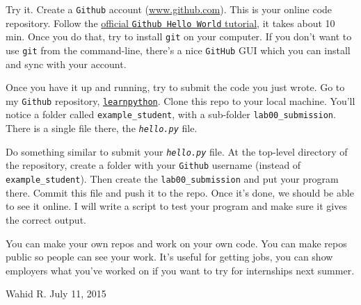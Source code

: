 \documentclass[letterpaper,14pt,oneside]{extarticle}
\begin{document}
Try it. Create a \texttt{Github} account (\url{www.github.com}). This is your online code repository. Follow the \href{https://guides.github.com/activities/hello-world/}{official \texttt{Github Hello World} tutorial}, it takes about 10 min. Once you do that, try to install \texttt{git} on your computer. If you don't want to use \texttt{git} from the command-line, there's a nice \texttt{GitHub} GUI which you can install and sync with your account.
\newline

Once you have it up and running, try to submit the code you just wrote. Go to my \texttt{Github} repository, \href{https://github.com/sinaptix/learnpython}{\texttt{learnpython}}. Clone this repo to your local machine. You'll notice a folder called \texttt{example\_student}, with a sub-folder \texttt{lab00\_submission}. There is a single file there, the \texttt{\textit{hello.py}} file.
\newline

Do something similar to submit your \texttt{\textit{hello.py}} file. At the top-level directory of the repository, create a folder with your \texttt{Github} username (instead of \texttt{example\_student}). Then create the \texttt{lab00\_submission} and put your program there. Commit this file and push it to the repo. Once it's done, we should be able to see it online. I will write a script to test your program and make sure it gives the correct output.
\newline

You can make your own repos and work on your own code. You can make repos public so people can see your work. It's useful for getting jobs, you can show employers what you've worked on if you want to try for internships next summer.
\newline

\begin{flushleft}
\textcopyright\enspace Wahid R. July 11, 2015
\end{flushleft}
\end{document}
